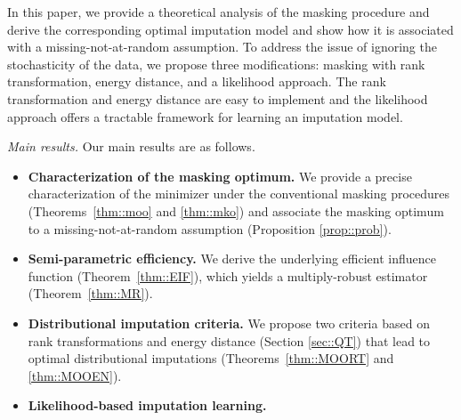 \documentclass[aos, preprint]{imsart}
\theoremstyle{plain}
\theoremstyle{definition}
\begin{document}
In this paper, we provide a theoretical analysis of the masking procedure
and derive the corresponding optimal imputation model and show how it is associated with a missing-not-at-random assumption. 
To address the issue of ignoring the stochasticity of the data, we propose three modifications:
masking with rank transformation, energy distance, and a likelihood approach. 
The rank transformation and energy distance are easy to implement and
the likelihood approach offers a tractable framework 
for learning an imputation model.


\emph{Main results.} Our main results are as follows.
\begin{itemize}
\item {\bf Characterization of the masking optimum.} We provide a precise characterization of the minimizer under the conventional masking procedures (Theorems~\ref{thm::moo} and \ref{thm::mko}) and associate the masking optimum to a missing-not-at-random assumption (Proposition \ref{prop::prob}).
\item {\bf Semi-parametric efficiency.} We derive the underlying efficient influence function 
 (Theorem~\ref{thm::EIF}), which yields a multiply-robust estimator (Theorem~\ref{thm::MR}). 
\item {\bf Distributional imputation criteria.} 
We propose two criteria based on rank transformations and energy distance (Section \ref{sec::QT})
that lead to optimal distributional imputations (Theorems~\ref{thm::MOORT} and \ref{thm::MOOEN}). 
\item {\bf Likelihood-based imputation learning.} 

\end{itemize}
\end{document}
